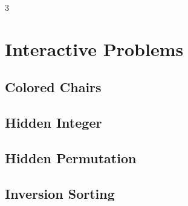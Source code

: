 \documentclass[8pt]{extarticle}
\begin{document}
\begin{multicols*}{3}

\section{Interactive Problems}

\subsection{Colored Chairs}
\begin{caixaenunciado}

\end{caixaenunciado}
\vspace{0.3cm}


\subsection{Hidden Integer}
\begin{caixaenunciado}

\end{caixaenunciado}
\vspace{0.3cm}


\subsection{Hidden Permutation}
\begin{caixaenunciado}

\end{caixaenunciado}
\vspace{0.3cm}


\subsection{Inversion Sorting}
\begin{caixaenunciado}

\end{caixaenunciado}
\vspace{0.3cm}



\end{multicols*}
\end{document}

